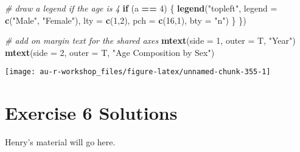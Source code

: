 \documentclass[]{book}
\newenvironment{Shaded}{\begin{snugshade}}{\end{snugshade}}
\newcommand{\KeywordTok}[1]{\textcolor[rgb]{0.13,0.29,0.53}{\textbf{#1}}}
\newcommand{\DataTypeTok}[1]{\textcolor[rgb]{0.13,0.29,0.53}{#1}}
\newcommand{\DecValTok}[1]{\textcolor[rgb]{0.00,0.00,0.81}{#1}}
\newcommand{\StringTok}[1]{\textcolor[rgb]{0.31,0.60,0.02}{#1}}
\newcommand{\CommentTok}[1]{\textcolor[rgb]{0.56,0.35,0.01}{\textit{#1}}}
\newcommand{\ControlFlowTok}[1]{\textcolor[rgb]{0.13,0.29,0.53}{\textbf{#1}}}
\newcommand{\OperatorTok}[1]{\textcolor[rgb]{0.81,0.36,0.00}{\textbf{#1}}}
\newcommand{\NormalTok}[1]{#1}
\theoremstyle{definition}
\theoremstyle{definition}
\theoremstyle{definition}
\theoremstyle{remark}
\begin{document}
\begin{Shaded}
\begin{Highlighting}[]
  \CommentTok{# draw a legend if the age is 4}
  \ControlFlowTok{if}\NormalTok{ (a }\OperatorTok{==}\StringTok{ }\DecValTok{4}\NormalTok{) \{}
    \KeywordTok{legend}\NormalTok{(}\StringTok{"topleft"}\NormalTok{, }\DataTypeTok{legend =} \KeywordTok{c}\NormalTok{(}\StringTok{"Male"}\NormalTok{, }\StringTok{"Female"}\NormalTok{),}
           \DataTypeTok{lty =} \KeywordTok{c}\NormalTok{(}\DecValTok{1}\NormalTok{,}\DecValTok{2}\NormalTok{), }\DataTypeTok{pch =} \KeywordTok{c}\NormalTok{(}\DecValTok{16}\NormalTok{,}\DecValTok{1}\NormalTok{), }\DataTypeTok{bty =} \StringTok{"n"}\NormalTok{)}
\NormalTok{  \}}
\NormalTok{\})}

\CommentTok{# add on margin text for the shared axes}
\KeywordTok{mtext}\NormalTok{(}\DataTypeTok{side =} \DecValTok{1}\NormalTok{, }\DataTypeTok{outer =}\NormalTok{ T, }\StringTok{"Year"}\NormalTok{)}
\KeywordTok{mtext}\NormalTok{(}\DataTypeTok{side =} \DecValTok{2}\NormalTok{, }\DataTypeTok{outer =}\NormalTok{ T, }\StringTok{"Age Composition by Sex"}\NormalTok{)}
\end{Highlighting}
\end{Shaded}

\begin{center}\texttt{[image: au-r-workshop\_files/figure-latex/unnamed-chunk-355-1]} \end{center}

\section*{Exercise 6 Solutions}\label{ex6-answers}

Henry's material will go here.


\end{document}
